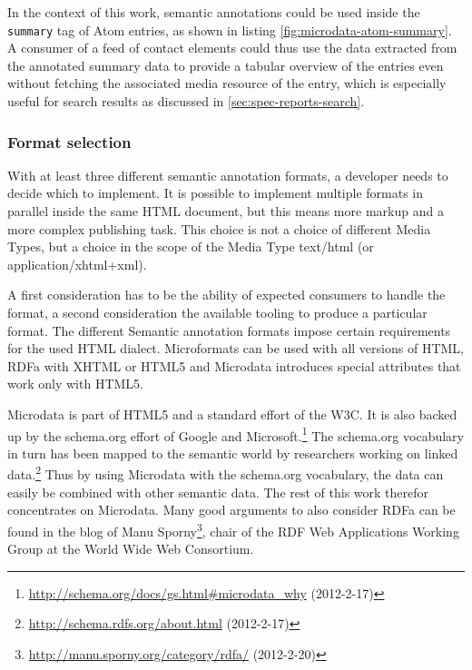 \documentclass[12pt,a4paper]{scrartcl}		%
\newcommand{\citeurl}[2]{\url{#1} (#2)}
\begin{document}
In the context of this work, semantic annotations could be used inside the
\lstinline:summary: tag of Atom entries, as shown in listing
\ref{fig:microdata-atom-summary}. A consumer of a feed of contact elements could
thus use the data extracted from the annotated summary data to provide a tabular
overview of the entries even without fetching the associated media resource of
the entry, which is especially useful for search results as discussed in
\autoref{sec:spec-reports-search}.

\subsubsection{Format selection}

With at least three different semantic annotation formats, a developer needs to
decide which to implement. It is possible to implement multiple formats in
parallel inside the same HTML document, but this means more markup and a more
complex publishing task\cite{Tennison2012}. This choice is not a choice of
different Media Types, but a choice in the scope of the Media Type text/html (or
application/xhtml+xml).

A first consideration has to be the ability of expected consumers to handle the
format, a second consideration the available tooling to produce a particular
format. The different Semantic annotation formats impose certain requirements
for the used HTML dialect. Microformats can be used with all versions of HTML,
RDFa with XHTML or HTML5 and Microdata introduces special attributes that work
only with HTML5\cite{Tennison2012}.

Microdata is part of HTML5 and a standard effort of the W3C\cite{Hickson2011}.
It is also backed up by the schema.org effort of Google and
Microsoft.\footnote{\citeurl{http://schema.org/docs/gs.html\#microdata_why}{2012-2-17}}
The schema.org vocabulary in turn has been mapped to the semantic world by
researchers working on linked
data.\footnote{\citeurl{http://schema.rdfs.org/about.html}{2012-2-17}} Thus by
using Microdata with the schema.org vocabulary, the data can easily be combined
with other semantic data. The rest of this work therefor concentrates on
Microdata. Many good arguments to also consider RDFa can be found in the blog of
Manu
Sporny\footnote{\citeurl{http://manu.sporny.org/category/rdfa/}{2012-2-20}},
chair of the RDF Web Applications Working Group at the World Wide Web
Consortium.

\end{document}
